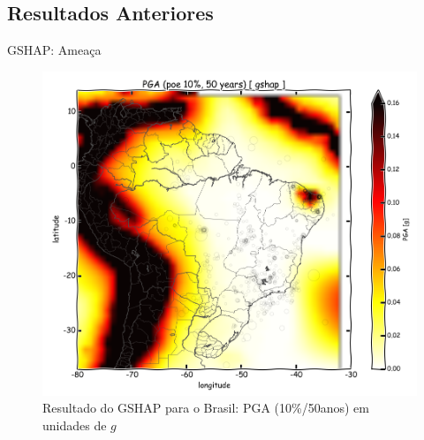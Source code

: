 \documentclass[ucs,8pt]{beamer}
\begin{document}
\subsection{Resultados Anteriores}
\begin{frame}{GSHAP: Ameaça}
\begin{figure}[H]
  \centering
  \includegraphics[height=.95\textheight]{pga_gshap} 
  \caption{Resultado do GSHAP para o Brasil: \gls{PGA} (10\%/50anos) em unidades de $g$}
  \label{fig:gshap} 
\end{figure}
\end{frame}
\end{document}
